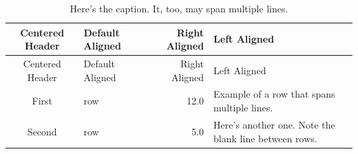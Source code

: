 \documentclass[english,floatsintext,man]{apa6}
\theoremstyle{definition}
\theoremstyle{definition}
\theoremstyle{remark}
\begin{document}
\begin{longtable}[]{@{}clrl@{}}
\caption{Here's the caption. It, too, may span multiple
lines.}\tabularnewline
\toprule
\begin{minipage}[b]{0.15\columnwidth}\centering\strut
Centered Header\strut
\end{minipage} & \begin{minipage}[b]{0.10\columnwidth}\raggedright\strut
Default Aligned\strut
\end{minipage} & \begin{minipage}[b]{0.20\columnwidth}\raggedleft\strut
Right Aligned\strut
\end{minipage} & \begin{minipage}[b]{0.31\columnwidth}\raggedright\strut
Left Aligned\strut
\end{minipage}\tabularnewline
\midrule
\endfirsthead
\toprule
\begin{minipage}[b]{0.15\columnwidth}\centering\strut
Centered Header\strut
\end{minipage} & \begin{minipage}[b]{0.10\columnwidth}\raggedright\strut
Default Aligned\strut
\end{minipage} & \begin{minipage}[b]{0.20\columnwidth}\raggedleft\strut
Right Aligned\strut
\end{minipage} & \begin{minipage}[b]{0.31\columnwidth}\raggedright\strut
Left Aligned\strut
\end{minipage}\tabularnewline
\midrule
\endhead
\begin{minipage}[t]{0.15\columnwidth}\centering\strut
First\strut
\end{minipage} & \begin{minipage}[t]{0.10\columnwidth}\raggedright\strut
row\strut
\end{minipage} & \begin{minipage}[t]{0.20\columnwidth}\raggedleft\strut
12.0\strut
\end{minipage} & \begin{minipage}[t]{0.31\columnwidth}\raggedright\strut
Example of a row that spans multiple lines.\strut
\end{minipage}\tabularnewline
\begin{minipage}[t]{0.15\columnwidth}\centering\strut
Second\strut
\end{minipage} & \begin{minipage}[t]{0.10\columnwidth}\raggedright\strut
row\strut
\end{minipage} & \begin{minipage}[t]{0.20\columnwidth}\raggedleft\strut
5.0\strut
\end{minipage} & \begin{minipage}[t]{0.31\columnwidth}\raggedright\strut
Here's another one. Note the blank line between rows.\strut
\end{minipage}\tabularnewline
\bottomrule
\end{longtable}
\end{document}
